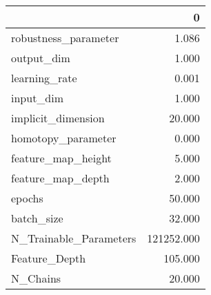 \begin{tabular}{lr}
\toprule
{} &           0 \\
\midrule
robustness\_parameter   &       1.086 \\
output\_dim             &       1.000 \\
learning\_rate          &       0.001 \\
input\_dim              &       1.000 \\
implicit\_dimension     &      20.000 \\
homotopy\_parameter     &       0.000 \\
feature\_map\_height     &       5.000 \\
feature\_map\_depth      &       2.000 \\
epochs                 &      50.000 \\
batch\_size             &      32.000 \\
N\_Trainable\_Parameters &  121252.000 \\
Feature\_Depth          &     105.000 \\
N\_Chains               &      20.000 \\
\bottomrule
\end{tabular}
